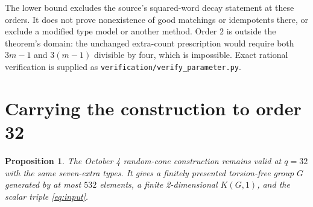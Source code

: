 \documentclass[11pt]{article}
\newtheorem{proposition}[theorem]{Proposition}
\begin{document}
The lower bound excludes the source's squared-word decay statement at
these orders. It does not prove nonexistence of good matchings or
idempotents there, or exclude a modified type model or another method.
Order $2$ is outside the theorem's domain: the unchanged extra-count
prescription would require both $3m-1$ and $3(m-1)$ divisible by four,
which is impossible. Exact rational verification is supplied as
\texttt{verification/verify\_parameter.py}.

\section{Carrying the construction to order 32}\label{sec:adaptation}
\begin{proposition}\label{prop:smaller}
The October 4 random-cone construction remains valid at $q=32$ with the
same seven-extra types. It gives a finitely presented torsion-free group
$G$ generated by at most $532$ elements, a finite 2-dimensional $K(G,1)$,
and the scalar triple \eqref{eq:input}.
\end{proposition}
\end{document}
